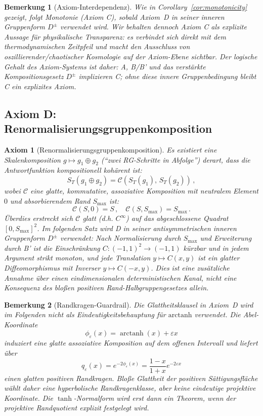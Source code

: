 \documentclass[aps,prd,twocolumn,superscriptaddress,nofootinbib]{revtex4-2}
\newtheorem{remark}{Bemerkung}
\newtheorem{axiom}{Axiom}
\begin{document}
\begin{remark}[Axiom-Interdependenz]
Wie in Corollary~\ref{cor:monotonicity} gezeigt, folgt Monotonie (Axiom C), sobald Axiom~D in seiner inneren Gruppenform $D^\pm$ verwendet wird. Wir behalten dennoch Axiom C als explizite Aussage für physikalische Transparenz: es verbindet sich direkt mit dem thermodynamischen Zeitpfeil und macht den Ausschluss von oszillierender/chaotischer Kosmologie auf der Axiom-Ebene sichtbar. Der logische Gehalt des Axiom-Systems ist daher: A, B/B' und das verstärkte Kompositionsgesetz $D^\pm$ implizieren C; ohne diese innere Gruppenbedingung bleibt C ein explizites Axiom.
\end{remark}

\subsection{Axiom D: Renormalisierungsgruppenkomposition}

\begin{axiom}[Renormalisierungsgruppenkomposition]
\label{ax:composition}
Es existiert eine Skalenkomposition $g \mapsto g_1 \oplus g_2$ (``zwei RG-Schritte in Abfolge'') derart, dass die Antwortfunktion kompositionell kohärent ist:
\begin{equation}
S_T(g_1 \oplus g_2) = \mathcal{C}\!\left(S_T(g_1),\, S_T(g_2)\right)\,,
\label{eq:composition}
\end{equation}
wobei $\mathcal{C}$ eine glatte, kommutative, assoziative Komposition mit neutralem Element $0$ und absorbierendem Rand $S_{\max}$ ist:
\begin{equation}
\mathcal{C}(S, 0) = S\,, \quad \mathcal{C}(S, S_{\max}) = S_{\max}\,.
\label{eq:composition_boundary}
\end{equation}
Überdies erstreckt sich $\mathcal{C}$ glatt (d.h. $C^\infty$) auf das abgeschlossene Quadrat $[0, S_{\max}]^2$. Im folgenden Satz wird D in seiner antisymmetrischen inneren Gruppenform $D^\pm$ verwendet: Nach Normalisierung durch $S_{\max}$ und Erweiterung durch B' ist die Einschränkung $C:(-1,1)^2\to(-1,1)$ kürzbar und in jedem Argument strikt monoton, und jede Translation $y\mapsto C(x,y)$ ist ein glatter Diffeomorphismus mit Inverser $y\mapsto C(-x,y)$. Dies ist eine zusätzliche Annahme über einen eindimensionalen deterministischen Kanal, nicht eine Konsequenz des bloßen positiven Rand-Halbgruppengesetzes allein.
\end{axiom}

\begin{remark}[Randkragen-Guardrail]
Die Glattheitsklausel in Axiom~D wird im Folgenden nicht als Eindeutigkeitsbehauptung für $\mathrm{arctanh}$ verwendet. Die Abel-Koordinate
\[
  \phi_\varepsilon(x)=\operatorname{arctanh}(x)+\varepsilon x
\]
induziert eine glatte assoziative Komposition auf dem offenen Intervall und liefert über
\[
  q_\varepsilon(x)=e^{-2\phi_\varepsilon(x)}
  =\frac{1-x}{1+x}e^{-2\varepsilon x}
\]
einen glatten positiven Randkragen. Bloße Glattheit der positiven Sättigungsfläche wählt daher eine hyperbolische Randkragenklasse, aber keine eindeutige projektive Koordinate. Die $\tanh$-Normalform wird erst dann ein Theorem, wenn der projektive Randquotient explizit festgelegt wird.
\end{remark}
\end{document}
